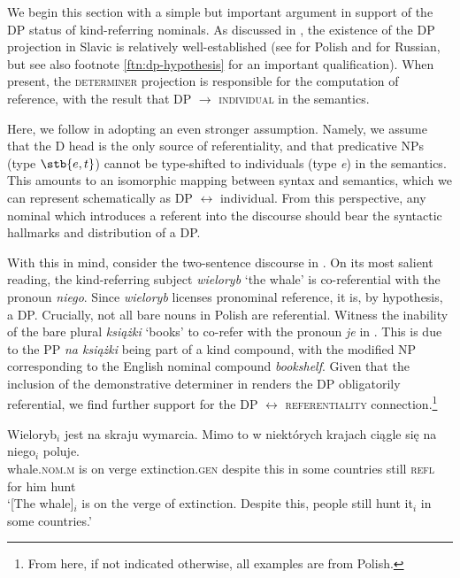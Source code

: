 \documentclass[output=paper,
colorlinks,
citecolor=brown,
newtxmath
]{langscibook}
\begin{document}
We begin this section with a simple but important argument in support of the DP status of kind-referring nominals. As discussed in , the existence of the DP projection in Slavic is relatively well-established (see \citealt{Willim2000} for Polish and \citealt{Pereltsvaig2007} for Russian, but see also footnote \ref{ftn:dp-hypothesis} for an important qualification). When present, the \textsc{determiner} projection is responsible for the computation of reference, with the result that DP $\rightarrow$ \textsc{individual} in the semantics.

Here, we follow \cite{Borer2005} in adopting an even stronger assumption. Namely, we assume that the D head is the only source of referentiality, and that predicative NPs (type $\stb{e,t}$) cannot be type-shifted to individuals (type \textit{e}) in the semantics. This amounts to an isomorphic mapping between syntax and semantics, which we can represent schematically as DP $\leftrightarrow$ individual. From this perspective, any nominal which introduces a referent into the discourse should bear the syntactic hallmarks and distribution of a DP.
\largerpage %

With this in mind, consider the two-sentence discourse in . On its most salient reading, the kind-referring subject \textit{wieloryb} `the whale' is co-referential with the pronoun \textit{niego}. Since \textit{wieloryb} licenses pronominal reference, it is, by hypothesis, a DP. Crucially, not all bare nouns in Polish are referential. Witness the inability of the bare plural \textit{książki} `books' to co-refer with the pronoun \textit{je} in . This is due to the PP \textit{na książki} being part of a kind compound, with the modified NP corresponding to the English nominal compound \textit{bookshelf}. Given that the inclusion of the demonstrative determiner in  renders the DP obligatorily referential, we find further support for the DP $\leftrightarrow$ \textsc{referentiality} connection.\footnote{From here, if not indicated otherwise, all examples are from Polish.}

\ea \gll
Wieloryb$_i$ jest na skraju wymarcia. Mimo to w niektórych krajach ciągle się na niego$_i$ poluje.\\
whale.\textsc{nom.m} is on verge extinction.\textsc{gen} despite this in some countries still \textsc{refl} for him hunt\\
\glt `[The whale]$_i$ is on the verge of extinction. Despite this, people still hunt it$_i$ in some countries.' \label{ex:whale_ref}
\z
\end{document}
